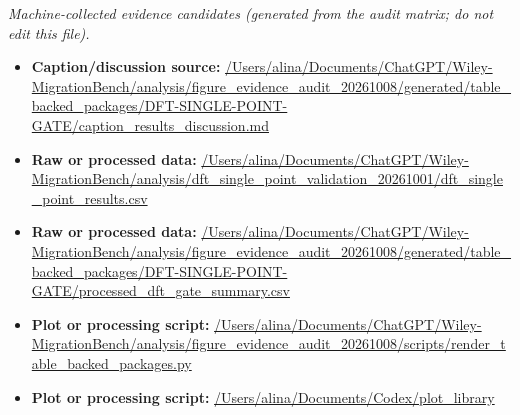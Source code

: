 \emph{Machine-collected evidence candidates (generated from the audit matrix; do not edit this file).}
\begin{itemize}[leftmargin=1.4em,noitemsep]
\item \textbf{Caption/discussion source:} \url{/Users/alina/Documents/ChatGPT/Wiley-MigrationBench/analysis/figure_evidence_audit_20261008/generated/table_backed_packages/DFT-SINGLE-POINT-GATE/caption_results_discussion.md}
\item \textbf{Raw or processed data:} \url{/Users/alina/Documents/ChatGPT/Wiley-MigrationBench/analysis/dft_single_point_validation_20261001/dft_single_point_results.csv}
\item \textbf{Raw or processed data:} \url{/Users/alina/Documents/ChatGPT/Wiley-MigrationBench/analysis/figure_evidence_audit_20261008/generated/table_backed_packages/DFT-SINGLE-POINT-GATE/processed_dft_gate_summary.csv}
\item \textbf{Plot or processing script:} \url{/Users/alina/Documents/ChatGPT/Wiley-MigrationBench/analysis/figure_evidence_audit_20261008/scripts/render_table_backed_packages.py}
\item \textbf{Plot or processing script:} \url{/Users/alina/Documents/Codex/plot_library}
\end{itemize}

